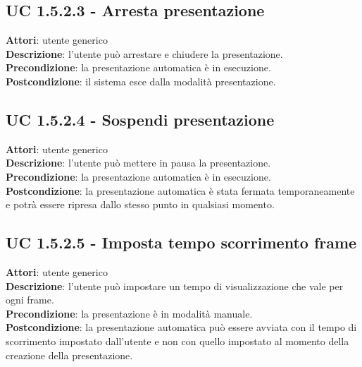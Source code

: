 	\subsection{UC 1.5.2.3 - Arresta presentazione}{
		\label{uc1.5.2.3}
		\textbf{Attori}: utente generico \\
		\textbf{Descrizione}: l'utente può arrestare e chiudere la presentazione. \\
		\textbf{Precondizione}: la presentazione automatica è in esecuzione.	\\
		\textbf{Postcondizione}: il sistema esce dalla modalità presentazione.	\\
	}
	\subsection{UC 1.5.2.4 - Sospendi presentazione}{
		\label{uc1.5.2.4}
		\textbf{Attori}: utente generico \\
		\textbf{Descrizione}: l'utente può mettere in pausa la presentazione. \\
		\textbf{Precondizione}: la presentazione automatica è in esecuzione.	\\
		\textbf{Postcondizione}: la presentazione automatica è stata fermata temporaneamente e potrà essere ripresa dallo stesso punto in qualsiasi momento.	\\
	}
	\subsection{UC 1.5.2.5 - Imposta tempo scorrimento frame}{
		\label{uc1.5.2.5}
		\textbf{Attori}: utente generico \\
		\textbf{Descrizione}: l'utente può impostare un tempo di visualizzazione che vale per ogni frame. \\
		\textbf{Precondizione}: la presentazione è in modalità manuale.	\\
		\textbf{Postcondizione}: la presentazione automatica può essere avviata con il tempo di scorrimento impostato dall'utente e non con quello impostato al momento della creazione della presentazione.	\\
	}
